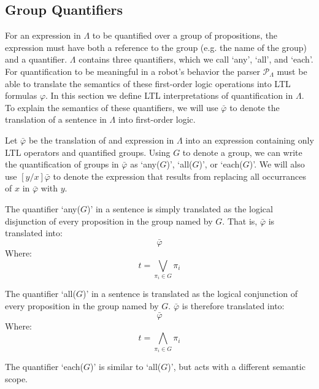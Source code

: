 \subsection{Group Quantifiers}

For an expression in $\Lambda$ to be quantified over a group of propositions, the expression must have both a reference to the group (e.g. the name of the group) and a quantifier. 
$\Lambda$ contains three quantifiers, which we call `any', `all', and `each'. 
For quantification to be meaningful in a robot's behavior the parser $\mathcal{P}_{\Lambda}$ must be able to translate the semantics of these first-order logic operations into LTL formulas $\varphi$.
In this section we define LTL interpretations of quantification in $\Lambda$.  
To explain the semantics of these quantifiers, we will use $\bar{\varphi}$ to denote the translation of a sentence in $\Lambda$ into first-order logic. 
\par Let $\bar{\varphi}$ be the translation of and expression in $\Lambda$ into an expression containing only LTL operators and quantified groups. 
Using $G$ to denote a group, we can write the quantification of groups in $\bar{\varphi}$ as `any($G$)', `all($G$)', or `each($G$)'. 
We will also use $[y/x]\bar{\varphi}$ to denote the expression that results from replacing all occurrances of $x$ in $\bar{\varphi}$ with $y$. 
\par
The quantifier `any($G$)' in a sentence is simply translated as the logical disjunction of every proposition in the group named by $G$. 
That is, $\bar{\varphi}$ is translated into: 
\begin{equation*}
	[ t / \text{any}(G)] \bar{\varphi}
\end{equation*}
Where: 
\begin{equation*}
	t = \bigvee \limits_{\pi_i \in G} \pi_i
\end{equation*}
\par
The quantifier `all($G$)' in a sentence is translated as the logical conjunction of every proposition in the group named by $G$. 
$\bar{\varphi}$ is therefore translated into: 
\begin{equation*}
	[ t / \text{all}(G)] \bar{\varphi}
\end{equation*}
Where:
\begin{equation*}
	t = \bigwedge \limits_{\pi_i \in G} \pi_i
\end{equation*}
\par
The quantifier `each($G$)' is similar to `all($G$)', but acts with a different semantic scope. 
